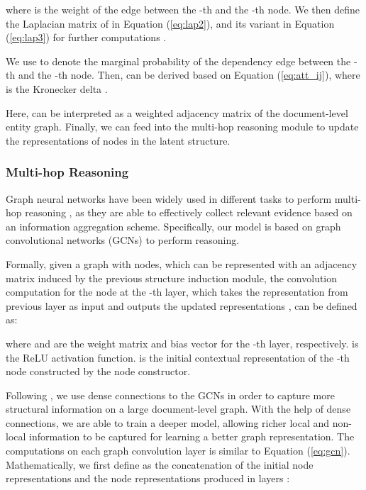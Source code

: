 \documentclass[11pt,a4paper]{article}
\begin{document}
where  is the weight of the edge between the -th  and the -th node. We then define the Laplacian matrix  of  in Equation (\ref{eq:lap2}), and its variant  in Equation (\ref{eq:lap3}) for further computations \cite{Koo2007StructuredPM}.



We use  to denote the marginal probability of the dependency edge between the -th and the -th node. Then,  can be derived based on Equation (\ref{eq:att_ij}), where  is the Kronecker delta \cite{Koo2007StructuredPM}.


\iffalse

\fi
\iffalse
where  is the Laplacian matrix for graph  and    is a variant of  that takes the root node into consideration, and  is the Kronecker delta. 
 is the marginal probability of the dependency edge between the -th and -th words. 
\fi
Here,  can be interpreted as a weighted adjacency matrix of the document-level entity graph. 
Finally, we can feed  into the multi-hop reasoning module to update the representations of nodes in the latent structure.


\subsubsection{Multi-hop Reasoning}
\label{ssec:3.2.2}
Graph neural networks have been widely used in different tasks to perform multi-hop reasoning \citep{song2018exploring, Yang2019AligningCE, Tu2019MultihopRC, kagnet-emnlp19}, as they are able to effectively collect relevant evidence based on an information aggregation scheme. Specifically, our model is based on graph convolutional networks (GCNs) \citep{Kipf2016SemiSupervisedCW} to perform reasoning.

Formally, given a graph  with  nodes, which can be represented with an  adjacency matrix  induced by the previous structure induction module, the convolution computation for the node  at the -th layer, which takes the representation  from previous layer as input and outputs the updated representations , can be defined as:

where  and  are the weight matrix and bias vector for the -th layer, respectively.  is the ReLU \citep{nair2010rectified} activation function.  is the initial contextual representation of the -th node constructed by the node constructor.

Following \citet{dcgcnforgraph2seq19guo}, we use dense connections to the GCNs in order to capture more structural information on a large document-level graph. With the help of dense connections, we are able to train a deeper model, allowing richer local and non-local information to be captured for learning a better graph representation. The computations on each graph convolution layer is similar to Equation (\ref{eq:gcn}).
\iffalse
Mathematically, we first define  as the concatenation of the initial node representations and the node representations produced in layers :
\end{document}
